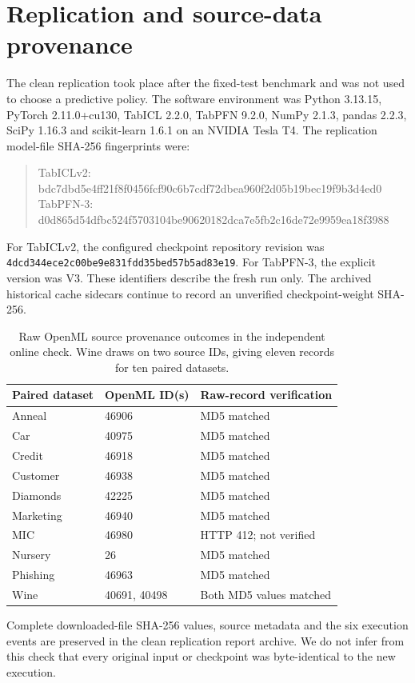 \documentclass[a4paper,fleqn]{cas-sc}
\begin{document}
\section{Replication and source-data provenance}
The clean replication took place after the fixed-test benchmark and was not used to choose a predictive policy. The software environment was Python 3.13.15, PyTorch 2.11.0+cu130, TabICL 2.2.0, TabPFN 9.2.0, NumPy 2.1.3, pandas 2.2.3, SciPy 1.16.3 and scikit-learn 1.6.1 on an NVIDIA Tesla T4. The replication model-file SHA-256 fingerprints were:
\begin{quote}\small\ttfamily
TabICLv2: bdc7dbd5e4ff21f8f0456fcf90c6b7cdf72dbea960f2d05b19bec19f9b3d4ed0\\
TabPFN-3: d0d865d54dfbc524f5703104be90620182dca7e5fb2c16de72e9959ea18f3988
\end{quote}
For TabICLv2, the configured checkpoint repository revision was \texttt{4dcd344ece2c00be9e831fdd35bed57b5ad83e19}. For TabPFN-3, the explicit version was V3. These identifiers describe the fresh run only. The archived historical cache sidecars continue to record an unverified checkpoint-weight SHA-256.

\begin{table}[htbp]
\centering
\caption{Raw OpenML source provenance outcomes in the independent online check. Wine draws on two source IDs, giving eleven records for ten paired datasets.}
\label{tab:openmlprovenance}
\begin{tabular}{lll}
\toprule
Paired dataset & OpenML ID(s) & Raw-record verification\\
\midrule
Anneal & 46906 & MD5 matched\\
Car & 40975 & MD5 matched\\
Credit & 46918 & MD5 matched\\
Customer & 46938 & MD5 matched\\
Diamonds & 42225 & MD5 matched\\
Marketing & 46940 & MD5 matched\\
MIC & 46980 & HTTP 412; not verified\\
Nursery & 26 & MD5 matched\\
Phishing & 46963 & MD5 matched\\
Wine & 40691, 40498 & Both MD5 values matched\\
\bottomrule
\end{tabular}
\end{table}
Complete downloaded-file SHA-256 values, source metadata and the six execution events are preserved in the clean replication report archive. We do not infer from this check that every original input or checkpoint was byte-identical to the new execution.
\end{document}
